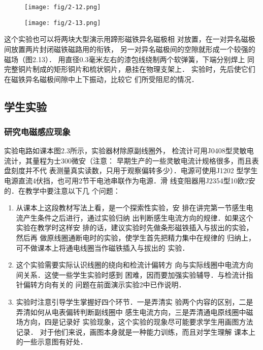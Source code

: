 \begin{figure}[htp]\centering
    \begin{minipage}[t]{0.48\textwidth}
    \centering
\texttt{[image: fig/2-12.png]}
    \caption{}
    \end{minipage}
    \begin{minipage}[t]{0.48\textwidth}
    \centering
\texttt{[image: fig/2-13.png]}
    \caption{}
    \end{minipage}
    \end{figure}

    这个实验也可以将两块大型演示用蹄形磁铁异名磁极相
对放置，在一对异名磁极间放置两片封闭磁铁磁路用的衔铁，
另一对异名磁极间的空隙就形成一个较强的磁场（图2.13）．
用直径0.3毫米左右的漆包线绕制两个软弹簧，下端分别焊上
同完整铜片制成的矩形铜片和梳状铜片，悬挂在物理支架上．
实验时，先后使它们在磁铁异名磁极间隙中上下振动，比较它
们所受阻尼的情况．


\subsection{学生实验}
\subsubsection{研究电磁感应现象}
实验电路如课本图2.3所示，实验器材除原副线圈外，
检流计可用J0408型灵敏电流计，其量程为士300微安（注意：
早期生产的一些灵敏电流计规格很多，而且表盘刻度并不代
表测量真实读数，只用于观察偏转多少）．电源可使用J1202
型学生电源直流4伏挡，也可用2节干电池串联作为电源．滑
线变阻器用J2354型10欧2安的．在教学中要注意以下几
个问题：
\begin{enumerate}
\item 从课本上这段教材写法上看，是一个探索性实验，安
排在讲完第一节感生电流产生条件之后进行，通过实验归纳
出判断感生电流方向的规律．如果这个实验在教学时这样安
排的话，建议实验时先做条形磁铁插入与拔出的实验，然后再
做原线圈通断电时的实验，使学生首先把精力集中在规律的
归纳上，可不做课本上将通电线圈当作磁铁插入与拔出的
实验．
\item 这个实验需要实际认识线圈的绕向和检流计偏转方
向与实际线圈中电流方向间关系．这使一些学生实验时感到
困难，因而要加强实验辅导．与检流计指针偏转方向有关的
问题在前面演示实验2中已作说明．
\item 实验时注意引导学生掌握好四个环节．一是弄清实
验两个内容的区别，二是弄清如何从电表偏转判断副线圈中
感生电流方向，三是弄清通电原线圈中磁场方向，四是记录好
实验现象，这个实验的现象尽可能要求学生用画图方法记录．
对于他们来说，画图本身就是一种能力训练，而且对学生理解
课本上的一些示意图有好处．
\end{enumerate}

